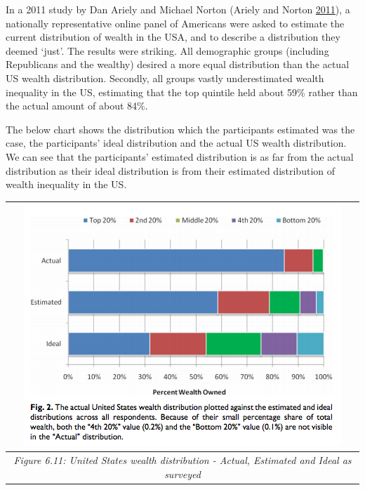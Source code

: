 \documentclass[]{tufte-handout}
\begin{document}
In a 2011 study by Dan Ariely and Michael Norton (Ariely and Norton
\protect\hyperlink{ref-Norton2011}{2011}), a nationally representative
online panel of Americans were asked to estimate the current
distribution of wealth in the USA, and to describe a distribution they
deemed `just'. The results were striking. All demographic groups
(including Republicans and the wealthy) desired a more equal
distribution than the actual US wealth distribution. Secondly, all
groups vastly underestimated wealth inequality in the US, estimating
that the top quintile held about 59\% rather than the actual amount of
about 84\%.

The below chart shows the distribution which the participants estimated
was the case, the participants' ideal distribution and the actual US
wealth distribution. We can see that the participants' estimated
distribution is as far from the actual distribution as their ideal
distribution is from their estimated distribution of wealth inequality
in the US.

\begin{longtable}[]{@{}c@{}}
\toprule
\begin{minipage}[b]{0.97\columnwidth}\centering
\includegraphics{ChapterPictures/6-10-UnitedStatesWealthDistributionActualEstimatedandIdeal.png}\strut
\end{minipage}\tabularnewline
\midrule
\endhead
\begin{minipage}[t]{0.97\columnwidth}\centering
\emph{Figure 6.11: United States wealth distribution - Actual, Estimated
and Ideal as surveyed}\strut
\end{minipage}\tabularnewline
\bottomrule
\end{longtable}
\end{document}
